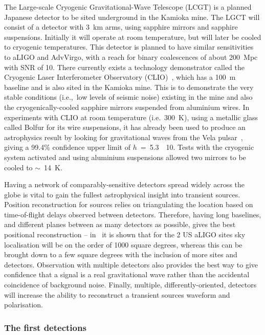 The Large-scale Cryogenic Gravitational-Wave Telescope (LCGT)
\cite{Miyoki:2005, Ohashi:2008, Kuroda:2010} is a planned Japanese detector to
be sited underground in the Kamioka mine. The LGCT will consist of a detector
with 3~km arms, using sapphire mirrors and sapphire suspensions. Initially it
will operate at room temperature, but will later be cooled to cryogenic
temperatures. This detector is planned to have similar sensitivities
to aLIGO and AdvVirgo, with a reach for binary coalescences of about 200~Mpc
with SNR of 10. There currently exists a technology demonstrator called the
Cryogenic Laser Interferometer Observatory (CLIO)~\cite{Yamamoto:2008, CLIOweb},
which has a 100~m baseline and is also sited in the Kamioka mine. This is to
demonstrate the very stable conditions (i.e.,\ low levels of seismic noise)
existing in the mine and also the cryogenically-cooled sapphire mirrors
suspended from aluminium wires. In experiments with CLIO at room temperature
(i.e.\, 300~K), using a metallic glass called Bolfur for its wire suspensions, it
has already been used to produce an astrophysics result by looking for
gravitational waves from the Vela pulsar~\cite{Akutsu:2008}, giving a 99.4\%
confidence upper limit of $h$~=~5.3~\texttimes~10. Tests with the cryogenic
system activated and using aluminium suspensions allowed two mirrors to be
cooled to $\sim$~14~K.


Having a network of comparably-sensitive detectors spread widely across the
globe is vital to gain the fullest astrophysical insight into transient sources.
Position reconstruction for sources relies on triangulating the location based
on time-of-flight delays observed between detectors. Therefore, having long
baselines, and different planes between as many detectors as possible, gives the
best positional reconstruction -- in~\cite{Fairhurst:2010} it is shown that for
the 2 US aLIGO sites sky localisation will be on the order of 1000 square degrees,
whereas this can be brought down to a few square degrees with the inclusion of
more sites and detectors. Observation with multiple detectors also provides the
best way to give confidence that a signal is a real gravitational wave rather
than the accidental coincidence of background noise. Finally, multiple,
differently-oriented, detectors will increase the ability to reconstruct a
transient sources waveform and polarisation.

\subsubsection{The first detections}

